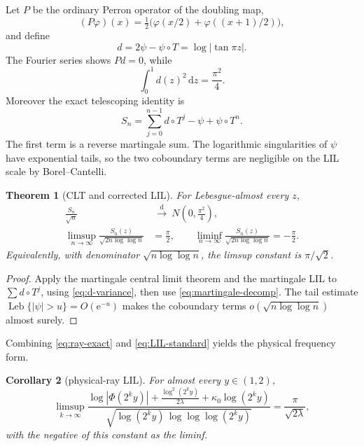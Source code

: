 \documentclass[11pt,oneside]{article}
\newtheorem{theorem}{Theorem}[section]
\newtheorem{corollary}[theorem]{Corollary}
\theoremstyle{definition}
\theoremstyle{remark}
\newcommand{\e}{\mathrm e}
\newcommand{\dd}{\,\mathrm d}
\newcommand{\T}{T}
\begin{document}
Let \(P\) be the ordinary Perron operator of the doubling map,
\[
 (P\varphi)(x)=\tfrac12\bigl(\varphi(x/2)+\varphi((x+1)/2)\bigr),
\]
and define
\begin{equation}
 d=2\psi-\psi\circ\T=\log|\tan\pi z|.
 \label{eq:d-martingale}
\end{equation}
The Fourier series shows \(Pd=0\), while
\begin{equation}
 \int_0^1d(z)^2\dd z=\frac{\pi^2}{4}.
 \label{eq:d-variance}
\end{equation}
Moreover the exact telescoping identity is
\begin{equation}
 S_n=\sum_{j=0}^{n-1}d\circ\T^j-\psi+\psi\circ\T^n.
 \label{eq:martingale-decomp}
\end{equation}
The first term is a reverse martingale sum.  The logarithmic singularities of
\(\psi\) have exponential tails, so the two coboundary terms are negligible on
the LIL scale by Borel--Cantelli.

\begin{theorem}[CLT and corrected LIL]
\label{thm:CLT-LIL}
For Lebesgue-almost every \(z\),
\begin{align}
 \frac{S_n}{\sqrt n}&\ \xrightarrow{\ \mathrm d\ }\
 N\!\left(0,\frac{\pi^2}{4}\right),
 \label{eq:CLT}\\
 \limsup_{n\to\infty}\frac{S_n(z)}{\sqrt{2n\log\log n}}
 &=\frac\pi2,
 \qquad
 \liminf_{n\to\infty}\frac{S_n(z)}{\sqrt{2n\log\log n}}
 =-\frac\pi2.
 \label{eq:LIL-standard}
\end{align}
Equivalently, with denominator \(\sqrt{n\log\log n}\), the limsup constant is
\(\pi/\sqrt2\).
\end{theorem}

\begin{proof}
Apply the martingale central limit theorem and the martingale LIL to
\(\sum d\circ\T^j\), using \eqref{eq:d-variance}, then use
\eqref{eq:martingale-decomp}.  The tail estimate
\(\operatorname{Leb}\{|\psi|>u\}=O(\e^{-u})\) makes the coboundary terms
\(o(\sqrt{n\log\log n})\) almost surely.
\end{proof}

Combining \eqref{eq:ray-exact} and \eqref{eq:LIL-standard} yields the physical
frequency form.

\begin{corollary}[physical-ray LIL]
\label{cor:physical-LIL}
For almost every \(y\in(1,2)\),
\begin{equation}
 \limsup_{k\to\infty}
 \frac{\log|\Phi(2^ky)|+\frac{\log^2(2^ky)}{2\lambda}
       +\kappa_0\log(2^ky)}
 {\sqrt{\log(2^ky)\,\log\log\log(2^ky)}}
 =\frac{\pi}{\sqrt{2\lambda}},
 \label{eq:physical-LIL}
\end{equation}
with the negative of this constant as the liminf.
\end{corollary}
\end{document}
